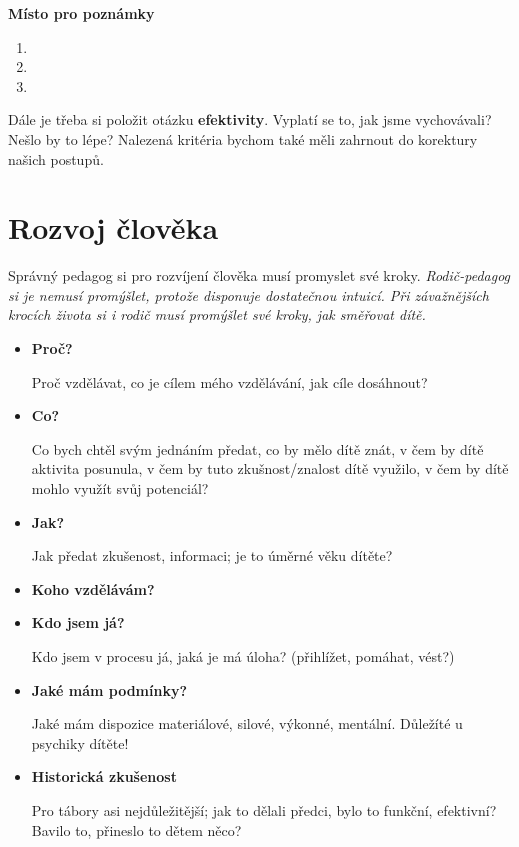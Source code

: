 \documentclass[a4paper,12pt]{report}
\begin{document}
\begin{samepage}\begin{flushleft}
\end{flushleft}
\textbf{Místo pro poznámky}
\begin{enumerate}
    \item 
    \item 
    \item 
\end{enumerate}
\vspace{2cm}\pagelogos
\end{samepage}

Dále je třeba si položit otázku \textbf{efektivity}. Vyplatí se to, jak jsme vychovávali? Nešlo by to lépe? Nalezená kritéria bychom také měli zahrnout do korektury našich postupů.

\newpage
\section{Rozvoj člověka}\pagelogos
Správný pedagog si pro rozvíjení člověka musí promyslet své kroky.
\textit{Rodič-pedagog si je nemusí promýšlet, protože disponuje dostatečnou intuicí. Při závažnějších krocích života si i rodič musí promýšlet své kroky, jak směřovat dítě.}

\begin{itemize}
 \item \textbf{Proč?}
 
Proč vzdělávat, co je cílem mého vzdělávání, jak cíle dosáhnout?

\item \textbf{Co?}

Co bych chtěl svým jednáním předat, co by mělo dítě znát, v čem by dítě aktivita posunula, v čem by tuto zkušnost/znalost dítě využilo, v čem by dítě mohlo využít svůj potenciál?

\item \textbf{Jak?}

Jak předat zkušenost, informaci; je to úměrné věku dítěte?

\item \textbf{Koho vzdělávám?}
\item \textbf{Kdo jsem já?}

Kdo jsem v procesu já, jaká je má úloha? \small{(přihlížet, pomáhat, vést?)}

\item \textbf{Jaké mám podmínky?}

Jaké mám dispozice materiálové, silové, výkonné, mentální. Důležíté u psychiky dítěte!

\item \textbf{Historická zkušenost}

Pro tábory asi nejdůležitější; jak to dělali předci, bylo to funkční, efektivní? Bavilo to, přineslo to dětem něco?
\end{itemize}
\end{document}
